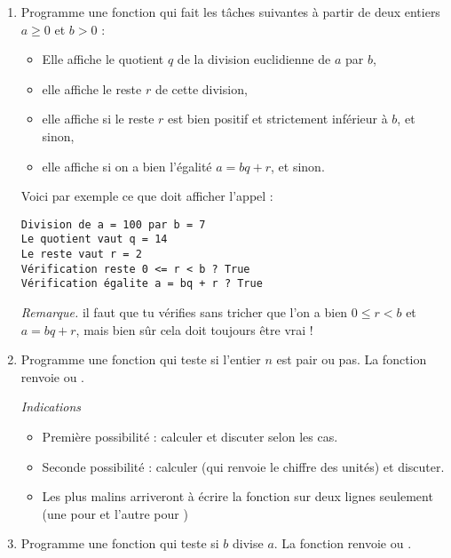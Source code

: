 \documentclass[11pt,class=report,crop=false]{standalone}
\begin{document}
\begin{activite}



\begin{enumerate}
  \item Programme une fonction  qui fait les tâches suivantes à partir de deux entiers $a\ge0$ et $b>0$ :
  \begin{itemize}
    \item Elle affiche le quotient $q$ de la division euclidienne de $a$ par $b$,
    \item elle affiche le reste $r$ de cette division,
    \item elle affiche  si le reste $r$ est bien positif et strictement inférieur à $b$, et  sinon,
    \item elle affiche  si on a bien l'égalité $a = bq+r$, et  sinon.
   \end{itemize}
    
Voici par exemple ce que doit afficher l'appel   :
\begin{lstlisting}  
Division de a = 100 par b = 7
Le quotient vaut q = 14
Le reste vaut r = 2
Vérification reste 0 <= r < b ? True
Vérification égalite a = bq + r ? True
\end{lstlisting}

\emph{Remarque.} il faut que tu vérifies sans tricher que l'on a bien $0 \le r<b$ et $a=bq+r$, mais bien sûr cela doit toujours être vrai !
  
  
  \item Programme une fonction  qui teste si l'entier $n$ est pair ou pas. La fonction renvoie   ou .
  
  \emph{Indications}
  \begin{itemize}
    \item Première possibilité : calculer  et discuter selon les cas.
    \item Seconde possibilité : calculer  (qui renvoie le chiffre des unités) et discuter.
    \item Les plus malins arriveront à écrire la fonction sur deux lignes seulement (une pour  et l'autre pour )
   \end{itemize}
   
  \item  Programme une fonction  qui teste si $b$ divise $a$. La fonction renvoie  ou .
  
\end{enumerate}   
     
\end{activite}
\end{document}
